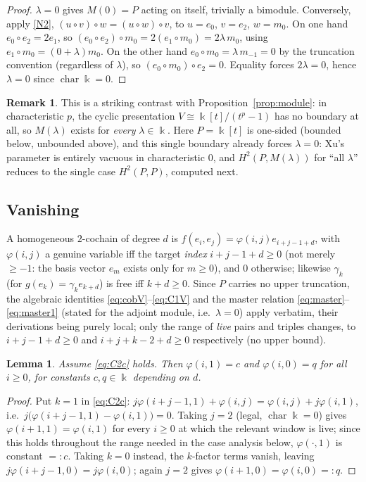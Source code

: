 \documentclass[11pt,reqno]{amsart}
\theoremstyle{plain}
\newtheorem{lemma}[theorem]{Lemma}
\theoremstyle{definition}
\newtheorem{remark}[theorem]{Remark}
\newcommand{\kk}{\Bbbk}
\newcommand{\Ht}{H^2}
\begin{document}
\begin{proof}
$\lambda=0$ gives $M(0)=P$ acting on itself, trivially a bimodule. Conversely, apply
\eqref{N2}, $(u\circ v)\circ w=(u\circ w)\circ v$, to $u=e_0$, $v=e_2$, $w=m_0$. On one hand
$e_0\circ e_2=2e_1$, so $(e_0\circ e_2)\circ m_0=2(e_1\circ m_0)=2\lambda\,m_0$, using
$e_1\circ m_0=(0+\lambda)m_0$. On the other hand $e_0\circ m_0=\lambda\,m_{-1}=0$ by the
truncation convention (regardless of $\lambda$), so $(e_0\circ m_0)\circ e_2=0$. Equality
forces $2\lambda=0$, hence $\lambda=0$ since $\operatorname{char}\kk=0$.
\end{proof}

\begin{remark}
This is a striking contrast with Proposition~\ref{prop:module}: in characteristic $p$, the
cyclic presentation $V\cong\kk[t]/(t^p-1)$ has no boundary at all, so $M(\lambda)$ exists for
\emph{every} $\lambda\in\kk$. Here $P=\kk[t]$ is one-sided (bounded below, unbounded above),
and this single boundary already forces $\lambda=0$: Xu's parameter is entirely vacuous in
characteristic $0$, and $\Ht(P,M(\lambda))$ for ``all $\lambda$'' reduces to the single case
$\Ht(P,P)$, computed next.
\end{remark}

\subsection{Vanishing}

A homogeneous $2$-cochain of degree $d$ is $f(e_i,e_j)=\varphi(i,j)e_{i+j-1+d}$, with
$\varphi(i,j)$ a genuine variable iff the target \emph{index} $i+j-1+d\ge0$ (not merely
$\ge-1$: the basis vector $e_m$ exists only for $m\ge0$), and $0$ otherwise; likewise
$\gamma_k$ (for $g(e_k)=\gamma_ke_{k+d}$) is free iff $k+d\ge0$. Since $P$ carries no upper
truncation, the algebraic identities \eqref{eq:cobV}--\eqref{eq:C1V} and the master relation
\eqref{eq:master}--\eqref{eq:master1} (stated for the adjoint module, i.e.\ $\lambda=0$)
apply verbatim, their derivations being purely local; only the range of \emph{live} pairs and
triples changes, to $i+j-1+d\ge0$ and $i+j+k-2+d\ge0$ respectively (no upper bound).

\begin{lemma}\label{lem:char0-const}
Assume \eqref{eq:C2c} holds. Then $\varphi(i,1)=c$ and $\varphi(i,0)=q$ for all $i\ge0$, for
constants $c,q\in\kk$ depending on $d$.
\end{lemma}

\begin{proof}
Put $k=1$ in \eqref{eq:C2c}: $j\varphi(i+j-1,1)+\varphi(i,j)=\varphi(i,j)+j\varphi(i,1)$, i.e.\
$j\bigl(\varphi(i+j-1,1)-\varphi(i,1)\bigr)=0$. Taking $j=2$ (legal, $\operatorname{char}\kk=0$)
gives $\varphi(i+1,1)=\varphi(i,1)$ for every $i\ge0$ at which the relevant window is live;
since this holds throughout the range needed in the case analysis below, $\varphi(\cdot,1)$
is constant $=:c$. Taking $k=0$ instead, the $k$-factor terms vanish, leaving
$j\varphi(i+j-1,0)=j\varphi(i,0)$; again $j=2$ gives $\varphi(i+1,0)=\varphi(i,0)=:q$.
\end{proof}
\end{document}

